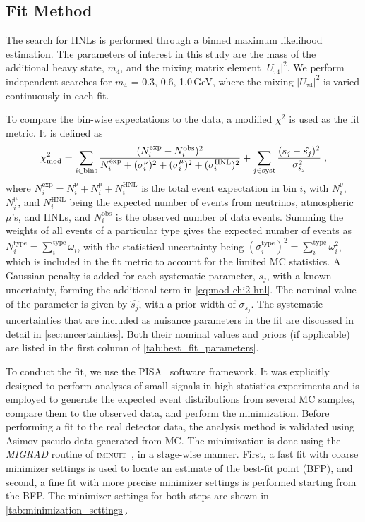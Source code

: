 \documentclass[
    aps,
    prd,
    reprint,
    amsmath,
    amssymb,
    nofootinbib,
    superscriptaddress,
    floatfix
]{revtex4-2}
\def\ut4{$|U_{\tau4}|^2$}
\renewcommand{\rm}{\mathrm}
\newcommand{\rm}{\mathrm}
\begin{document}
\subsection{\label{sec:analysis_setup}Fit Method}

The search for HNLs is performed through a binned maximum likelihood estimation. The parameters of interest in this study are the mass of the additional heavy state, $m_4$, and the mixing matrix element \ut4. We perform independent searches for $m_4$ = {0.3, 0.6, 1.0}\,GeV, where the mixing \ut4 is varied continuously in each fit.

To compare the bin-wise expectations to the data, a modified $\chi^2$ is used as the fit metric. It is defined as
\begin{equation}
    \footnotesize
    \chi^2_{\mathrm{mod}} =
    \sum_{i \in \mathrm{bins}}^{}\frac{(N^{\rm{exp}}_i - N^{\mathrm{obs}}_i)^2}{N^{\rm{exp}}_i + (\sigma^{\mathrm{\nu}}_i)^2 + (\sigma^{\mathrm{\mu}}_i)^2 + (\sigma^{\mathrm{HNL}}_i)^2}
    + \sum_{j \in \mathrm{syst}}^{}\frac{(s_j - \hat{s_j})^2}{\sigma^2_{s_j}}
    \;,
    \label{eq:mod-chi2-hnl}
\end{equation}
where $N^{\rm{exp}}_i = N^{\mathrm{\nu}}_i + N^{\mathrm{\mu}}_i + N^{\mathrm{HNL}}_i$ is the total event expectation in bin $i$, with $N^{\mathrm{\nu}}_i$, $N^{\mathrm{\mu}}_i$, and $N^{\mathrm{HNL}}_i$ being the expected number of events from neutrinos, atmospheric $\mu$'s, and HNLs, and $N^{\mathrm{obs}}_i$ is the observed number of data events. Summing the weights of all events of a particular type gives the expected number of events as $N^{\mathrm{type}}_i = \sum_i^\rm{type}\omega_i$, with the statistical uncertainty being $(\sigma^{\mathrm{type}}_i)^2 = \sum_i^\rm{type}\omega_i^2$, which is included in the fit metric to account for the limited MC statistics. A Gaussian penalty is added for each systematic parameter, $s_j$, with a known uncertainty, forming the additional term in \cref{eq:mod-chi2-hnl}. The nominal value of the parameter is given by $\hat{s_j}$, with a prior width of $\sigma_{s_j}$. The systematic uncertainties that are included as nuisance parameters in the fit are discussed in detail in \cref{sec:uncertainties}. Both their nominal values and priors (if applicable) are listed in the first column of \cref{tab:best_fit_parameters}.

To conduct the fit, we use the \textsc{PISA}~\cite{pisa_paper, pisa_software} software framework.
It was explicitly designed to perform analyses of small signals in high-statistics experiments and is employed to generate the expected event distributions from several MC samples, compare them to the observed data, and perform the minimization.
Before performing a fit to the real detector data, the analysis method is validated using Asimov pseudo-data generated from MC.
The minimization is done using the \textit{MIGRAD} routine of \textsc{iminuit}~\cite{iminuit_v2.17.0}, in  a stage-wise manner.
First, a fast fit with coarse minimizer settings is used to locate an estimate of the best-fit point (BFP), and second, a fine fit with more precise minimizer settings is performed starting from the BFP. The minimizer settings for both steps are shown in \cref{tab:minimization_settings}.
\end{document}
